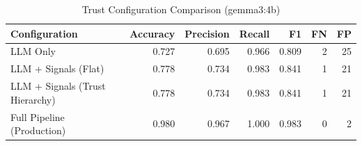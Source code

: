 \begin{table}[h]
\centering
\caption{Trust Configuration Comparison (gemma3:4b)}
\label{tab:e6_config_comparison}
\begin{tabular}{l r r r r r r}
\hline
Configuration & Accuracy & Precision & Recall & F1 & FN & FP \\
\hline
LLM Only & 0.727 & 0.695 & 0.966 & 0.809 & 2 & 25 \\
LLM + Signals (Flat) & 0.778 & 0.734 & 0.983 & 0.841 & 1 & 21 \\
LLM + Signals (Trust Hierarchy) & 0.778 & 0.734 & 0.983 & 0.841 & 1 & 21 \\
Full Pipeline (Production) & 0.980 & 0.967 & 1.000 & 0.983 & 0 & 2 \\
\hline
\end{tabular}
\end{table}